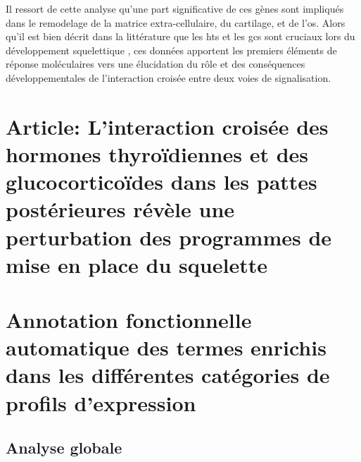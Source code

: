 \documentclass[../main.tex]{subfiles}
\begin{document}
Il ressort de cette analyse qu'une part significative de ces gènes sont impliqués dans le remodelage de la matrice extra-cellulaire, du cartilage, et de l'os.
Alors qu'il est bien décrit dans la littérature que les \glspl{ht} et les \glspl{gc} sont cruciaux lors du développement squelettique , ces données apportent les premiers éléments de réponse moléculaires vers une élucidation du rôle et des conséquences développementales de l'interaction croisée entre deux voies de signalisation.




\section{Article: L'interaction croisée des hormones thyroïdiennes et des glucocorticoïdes dans les pattes postérieures révèle une perturbation des programmes de mise en place du squelette}\label{sec:grimaldi2014}

%
%
%
%
%




\section{Annotation fonctionnelle automatique des termes enrichis dans les différentes catégories de profils d'expression}\label{sec:hlc-preanalysis}


\subsection{Analyse globale}
\end{document}
